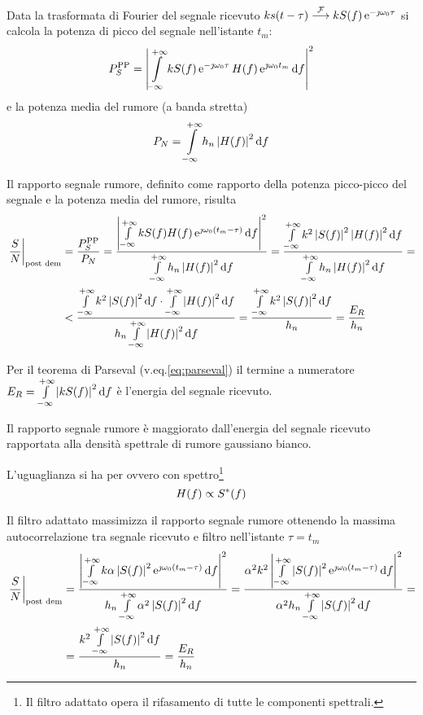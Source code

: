 Data la trasformata di Fourier del segnale ricevuto $k s(t-\tau) \stackrel{\operatorname{\mathcal{F}}}{\longrightarrow} k S(f) \operatorname{e}^{-\jmath\omega_0\tau}$ si calcola la potenza di picco del segnale nell'istante $t_m$:
\begin{equation}
P_S^\text{PP}=\left|{\int\limits_{-\infty}^{+\infty}{k S(f)\operatorname{e}^{-\jmath\omega_0 \tau} H(f)\operatorname{e}^{\jmath\omega_0 t_m}}{\,\mathop{}\!\mathrm{d}{f}}}\right|^2
\end{equation}
e la potenza media del rumore (a banda stretta)
\begin{equation}
P_N=\int\limits_{-\infty}^{+\infty}{h_n\left|{H(f)}\right|^2}{\,\mathop{}\!\mathrm{d}{f}}
\end{equation}

Il rapporto segnale rumore, definito come rapporto della potenza picco-picco del segnale e la potenza media del rumore, risulta
\begin{equation}\begin{split}
\restrict{\frac{S}{N}}{\text{post dem}}&=\frac{P_S^\text{PP}}{P_N}=\frac{\abs{\intinf{k S(f) H(f)\e{\jmath\omega_0 (t_m-\tau)}}{f}}^2}{\intinf{h_n\abs{H(f)}^2}{f}}=
\frac{\intinf{k^2\abs{S(f)}^2\abs{H(f)}^2}{f}}{\intinf{h_n\abs{H(f)}^2}{f}}=\\
&<\frac{\intinf{k^2\abs{S(f)}^2}{f}\cdot\intinf{\abs{H(f)}^2}{f}}{h_n\intinf{\abs{H(f)}^2}{f}}=\frac{\intinf{k^2\abs{S(f)}^2}{f}}{h_n}=\frac{E_R}{h_n}
\end{split}\end{equation}

Per il teorema di Parseval (v.eq.\ref{eq:parseval}) il termine a numeratore $E_R=\int\limits_{-\infty}^{+\infty}{\left|{k S(f)}\right|^2}{\,\mathop{}\!\mathrm{d}{f}}$ è l'energia del segnale ricevuto.

Il rapporto segnale rumore è maggiorato dall'energia del segnale ricevuto rapportata alla densità spettrale di rumore gaussiano bianco.

L'uguaglianza si ha per  ovvero con spettro\footnote{Il filtro adattato opera il rifasamento di tutte le componenti spettrali.} \begin{equation}H(f)\propto{S}^\ast(f)\label{eq:radar_filtro_adattato_rumore_bianco}\end{equation}

Il filtro adattato massimizza il rapporto segnale rumore ottenendo la massima autocorrelazione tra segnale ricevuto e filtro nell'istante $\tau=t_m$
\begin{equation}\begin{split}
\left.{\frac{S}{N}}\right\rvert_{\text{post dem}}&=\dfrac{\left|{\int\limits_{-\infty}^{+\infty}{k\alpha\left|{S(f)}\right|^2\operatorname{e}^{\jmath\omega_0(t_m-\tau)}}{\,\mathop{}\!\mathrm{d}{f}}}\right|^2}{h_n\int\limits_{-\infty}^{+\infty}{\alpha^2\left|{S(f)}\right|^2}{\,\mathop{}\!\mathrm{d}{f}}}=\dfrac{\alpha^2 k^2\left|{\int\limits_{-\infty}^{+\infty}{\left|{S(f)}\right|^2\operatorname{e}^{\jmath\omega_0(t_m-\tau)}}{\,\mathop{}\!\mathrm{d}{f}}}\right|^2}{\alpha^2 h_n\int\limits_{-\infty}^{+\infty}{\left|{S(f)}\right|^2}{\,\mathop{}\!\mathrm{d}{f}}}=\\
&=\frac{k^2\int\limits_{-\infty}^{+\infty}{\left|{S(f)}\right|^2}{\,\mathop{}\!\mathrm{d}{f}}}{h_n}=\frac{E_R}{h_n}
\end{split}\end{equation}

